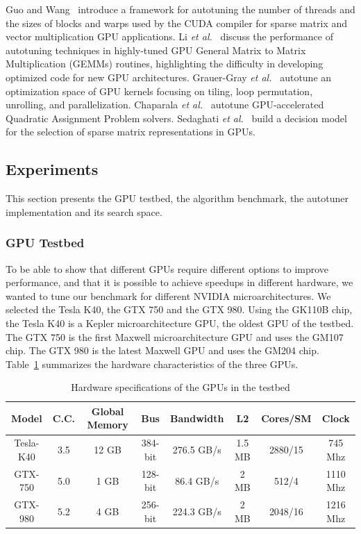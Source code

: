 Guo and Wang~\cite{guo2010auto} introduce a framework for autotuning
the number of threads and the sizes of blocks and warps used by the CUDA
compiler for sparse matrix and vector multiplication GPU applications.  Li
\emph{et al.}~\cite{li2009note} discuss the performance of autotuning
techniques in highly-tuned GPU General Matrix to Matrix Multiplication (GEMMs)
routines, highlighting the difficulty in developing optimized code for new GPU
architectures.  Grauer-Gray \emph{et al.}~\cite{grauer2012auto}
autotune an optimization space of GPU kernels focusing on tiling, loop
permutation, unrolling, and parallelization.  Chaparala \emph{et
al.}~\cite{chaparala2015autotuning} autotune GPU-accelerated Quadratic
Assignment Problem solvers.  Sedaghati \emph{et
al.}~\cite{sedaghati2015automatic} build a decision model for the selection of
sparse matrix representations in GPUs.

\subsection{Experiments}

This section presents the GPU testbed, the algorithm benchmark, the
autotuner implementation and its search space.

\subsubsection{GPU Testbed}

To be able to show that different GPUs require different options to improve
performance, and that it is possible to achieve speedups in different hardware,
we wanted to tune our benchmark for different NVIDIA microarchitectures.  We
selected the Tesla K40, the GTX 750 and the GTX 980.  Using the GK110B chip,
the Tesla K40 is a Kepler microarchitecture GPU, the oldest GPU of the testbed.
The GTX 750 is the first Maxwell microarchitecture GPU and uses the GM107 chip.
The GTX 980 is the latest Maxwell GPU and uses the GM204 chip.
Table~\ref{tab:GPUs} summarizes the hardware characteristics of the three GPUs.

\begin{table}[thpb]
    \centering
    \footnotesize
    \begin{tabular}{cccccccc}
        \toprule
        \textbf{Model}&\textbf{C.C.}&\textbf{Global Memory}&\textbf{Bus}&\textbf{Bandwidth}&\textbf{L2}&\textbf{Cores/SM}&\textbf{Clock} \\ \midrule
        Tesla-K40&3.5&12 GB&384-bit&276.5 GB/s&1.5 MB&2880/15&745 Mhz \\ \midrule
        GTX-750&5.0&1 GB&128-bit&86.4 GB/s&2 MB&512/4&1110 Mhz \\ \midrule
        GTX-980&5.2&4 GB&256-bit&224.3 GB/s&2 MB&2048/16&1216 Mhz \\ \bottomrule
    \end{tabular}
    \caption{Hardware specifications of the GPUs in the testbed}
    \label{tab:GPUs}
\end{table}

